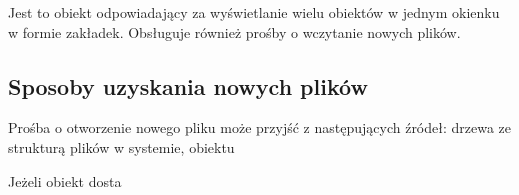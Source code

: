 \label{sec:sokar-dicomtabs}

\par
Jest to obiekt odpowiadający za wyświetlanie wielu obiektów  w jednym okienku w formie zakładek.
Obsługuje również prośby o wczytanie nowych plików.

\subsection{Sposoby uzyskania nowych plików}

\par
Prośba o otworzenie nowego pliku może przyjść z następujących źródeł: drzewa ze strukturą plików w systemie, obiektu

\par
Jeżeli obiekt dosta